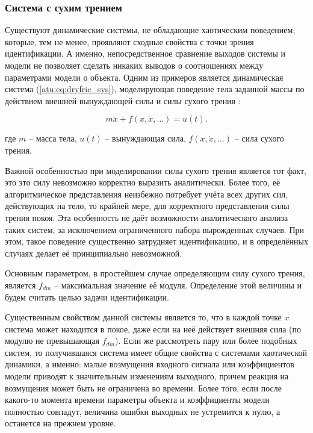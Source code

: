 
\FloatBarrier
\subsubsection{Система с сухим трением} %


Существуют динамические системы, не обладающие хаотическим поведением,
которые, тем не менее, проявляют сходные свойства с точки зрения идентификации.
А именно, непосредственное сравнение выходов системы и модели не позволяет
сделать никаких выводов о соотношениях между параметрами модели о объекта.
Одним из примеров является динамическая система (\ref{atu:eq:dryfric_sys}),
моделирующая поведение тела заданной массы по действием внешней вынуждающей силы
и силы сухого трения
\cite{berger_friction,atu_asau11}:

\begin{equation}
 m \ddot{x} + f( x, \dot{x}, \ldots)  = u(t).
\label{atu:eq:dryfric_sys}
\end{equation}

\noindent
где
$m$ -- масса тела,
$u(t)$ -- вынуждающая сила,
$ f( x, \dot{x}, \ldots)  $ -- сила сухого трения.

Важной особенностью при моделировании силы сухого трения является тот факт,
это это силу невозможно корректно выразить аналитически. Более того,
её алгоритмическое представления неизбежно потребует учёта всех других сил,
действующих на тело, то крайней мере, для корректного представления
силы трения покоя. Эта особенность не даёт возможности
аналитического анализа таких систем, за исключением ограниченного набора
вырожденных случаев. При этом, такое поведение существенно затрудняет идентификацию,
и в определённых случаях делает её принципиально невозможной.

Основным параметром, в простейшем случае определяющим силу сухого
трения, является $f_{dm}$ -- максимальная значение её модуля.
Определение этой величины и будем считать целью задачи идентификации.

Существенным свойством данной системы является то, что в каждой точке \(x\)
система может находится в покое, даже если на неё действует
внешняя сила (по модулю не превышающая $f_{dm}$).
Если же рассмотреть пару или более подобных систем,
то получившаяся система имеет общие свойства с системами
хаотической динамики, а именно: малые возмущения входного сигнала
или коэффициентов модели приводят к значительным изменениям
выходного, причем реакция на возмущения может быть
не ограничена во времени.
Более того, если после какого-то момента времени
параметры объекта и коэффициенты модели полностью совпадут,
величина ошибки выходных не устремится к нулю, а останется на прежнем уровне.

